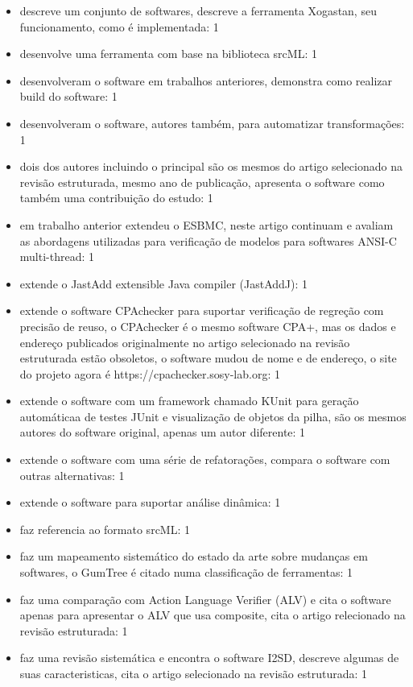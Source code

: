 \begin{itemize}
\item descreve um conjunto de softwares, descreve a ferramenta Xogastan, seu funcionamento, como é implementada: 1
\item desenvolve uma ferramenta com base na biblioteca srcML: 1
\item desenvolveram o software em trabalhos anteriores, demonstra como realizar build do software: 1
\item desenvolveram o software, autores também, para automatizar transformações: 1
\item dois dos autores incluindo o principal são os mesmos do artigo selecionado na revisão estruturada, mesmo ano de publicação, apresenta o software como também uma contribuição do estudo: 1
\item em trabalho anterior extendeu o ESBMC, neste artigo continuam e avaliam as abordagens utilizadas para verificação de modelos para softwares ANSI-C multi-thread: 1
\item extende o JastAdd extensible Java compiler (JastAddJ): 1
\item extende o software CPAchecker para suportar verificação de regreção com precisão de reuso, o CPAchecker é o mesmo software CPA+, mas os dados e endereço publicados originalmente no artigo selecionado na revisão estruturada estão obsoletos, o software mudou de nome e de endereço, o site do projeto agora é https://cpachecker.sosy-lab.org: 1
\item extende o software com um framework chamado KUnit para geração automáticaa de testes JUnit e visualização de objetos da pilha, são os mesmos autores do software original, apenas um autor diferente: 1
\item extende o software com uma série de refatorações, compara o software com outras alternativas: 1
\item extende o software para suportar análise dinâmica: 1
\item faz referencia ao formato srcML: 1
\item faz um mapeamento sistemático do estado da arte sobre mudanças em softwares, o GumTree é citado numa classificação de ferramentas: 1
\item faz uma comparação com Action Language Verifier (ALV) e cita o software apenas para apresentar o ALV que usa composite, cita o artigo relecionado na revisão estruturada: 1
\item faz uma revisão sistemática e encontra o software I2SD, descreve algumas de suas caracteristicas, cita o artigo selecionado na revisão estruturada: 1

\end{itemize}
